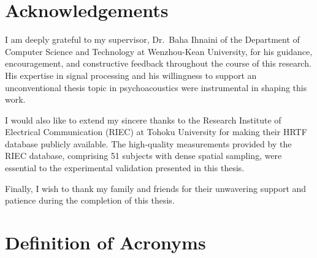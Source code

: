 \documentclass[12pt,a4paper]{article}
\begin{document}
\newpage

\section*{Acknowledgements}

I am deeply grateful to my supervisor, Dr.\ Baha Ihnaini of the Department of Computer Science and Technology at Wenzhou-Kean University, for his guidance, encouragement, and constructive feedback throughout the course of this research. His expertise in signal processing and his willingness to support an unconventional thesis topic in psychoacoustics were instrumental in shaping this work.

I would also like to extend my sincere thanks to the Research Institute of Electrical Communication (RIEC) at Tohoku University for making their HRTF database publicly available. The high-quality measurements provided by the RIEC database, comprising 51 subjects with dense spatial sampling, were essential to the experimental validation presented in this thesis.

Finally, I wish to thank my family and friends for their unwavering support and patience during the completion of this thesis.

\newpage

\tableofcontents

\newpage

\listoffigures

\vspace{1cm}

\listoftables

\newpage

\section*{Definition of Acronyms}
\end{document}

